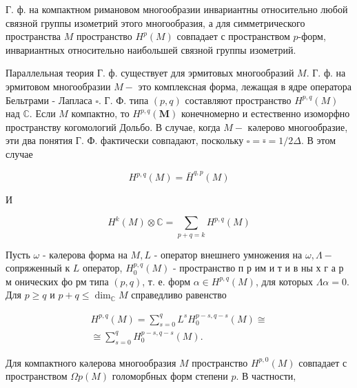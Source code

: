 \documentclass[10pt]{article}
\begin{document}
Г. ф. на компактном римановом многообразии инвариантны относительно любой связной группы изометрий этого многообразия, а для симметрического пространства $M$ пространство $H^{p}(M)$ совпадает с пространством $p$-форм, инвариантных относительно наибольшей связной группы изометрий.



Параллельная теория Г. ф. существует для эрмитовых многообразий $M$. Г. ф. на эрмитовом многообразии $M-$ это комплексная форма, лежащая в ядре оператора Бельтрами - Лапласа $\square$. Г. Ф. типа $(p, q)$ составляют пространство $H^{p, q}(M)$ над $\mathbb{C}$. Если $M$ компактно, то $H^{p, q}(\boldsymbol{M})$ конечномерно и естественно изоморфно пространству когомологий Дольбо. В случае, когда $M-$ кәлерово многообразие, эти два понятия Г. Ф. фактически совпадают, поскольку $\square=\bar{\square}=1 / 2 \Delta$. В этом случае



\[

H^{p, q}(M)=\bar{H}^{q, p}(M)

\]



И



\[

H^{k}(M) \otimes \mathbb{C}=\sum_{p+q=k} H^{p, q}(M)

\]



Пусть $\omega$ - кәлерова форма на $M, L$ - оператор внешнего умножения на $\omega, \Lambda-$ сопряженный к $L$ оператор, $H_{0}^{p, q}(M)$ - пространство п р им и т и в ны х г а р м онических фо рм типа $(p, q)$, т. е. форм $\alpha \in H^{p, q}(M)$, для которых $\Lambda \alpha=0$. Для $p \geqslant q$ и $p+q \leqslant \operatorname{dim}_{\mathbb{C}} M$ справедливо равенство



\[

\begin{gathered}

H^{p, q}(M)=\sum_{s=0}^{q} L^{s} H_{0}^{p-s, q-s}(M) \cong \\

\cong \sum_{s=0}^{q} H_{0}^{p-s, q-s}(M) .

\end{gathered}

\]



Для компактного кәлерова многообразия $M$ пространство $H^{p, 0}(M)$ совпадает с пространством $\Omega p(M)$ голоморбных форм степени $p$. В частности,
\end{document}

